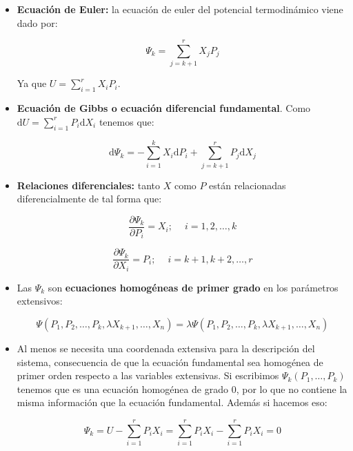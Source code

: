 \documentclass[12pt,a4paper]{article}
\newcommand{\D}{\mathrm{d}}
\newcommand{\parciales}[2]{\frac{\partial #1}{\partial #2}}
\begin{document}
\begin{itemize}

\item  \textbf{Ecuación de Euler:} la ecuación de euler del potencial termodinámico viene dado por: 

\begin{equation}
\Psi_k = \sum_{j=k+1}^r X_j P_j
\end{equation}


Ya que $U = \sum_{i=1}^r X_i P_i$. 
\item \textbf{Ecuación de Gibbs o ecuación diferencial fundamental}. Como $\D U = \sum_{i=1}^r P_i \D X_i$ tenemos que:

\begin{equation}
\D \Psi_k =  - \sum_{i=1}^k X_i \D P_i + \sum_{j=k+1}^r P_j \D X_j 
\end{equation}

\item \textbf{Relaciones diferenciales:} tanto $X$ como $P$ están relacionadas diferencialmente de tal forma que:


\begin{equation}
\parciales{\Psi_k}{P_i} = X_i; \ \quad i = 1,2, \ldots, k
 \end{equation}

\begin{equation}
\parciales{\Psi_k}{X_i} = P_i; \ \quad i = k+1, k+2, \ldots, r
 \end{equation}

\item Las $\Psi_k$ son \textbf{ecuaciones homogéneas de primer grado} en los parámetros extensivos:

\begin{equation}
\Psi (P_1, P_2, \ldots, P_k, \lambda X_{k+1}, \ldots, X_{n}) = \lambda \Psi (P_1, P_2, \ldots, P_k, \lambda X_{k+1}, \ldots, X_{n})
\end{equation}

\item Al menos se necesita una coordenada extensiva para la descripción del sistema, consecuencia de que la ecuación fundamental sea homogénea de primer orden respecto a las variables extensivas. Si escribimos $\Psi_k(P_1, \ldots, P_k)$ tenemos que es una ecuación homogénea de grado 0, por lo que no contiene la misma información que la ecuación fundamental. Además si hacemos eso:

$$ \Psi_k = U - \sum_{i=1}^r P_i X_i =  \sum_{i=1}^r P_i X_i  -  \sum_{i=1}^r P_i X_i  = 0 $$



\end{itemize}
\end{document}
